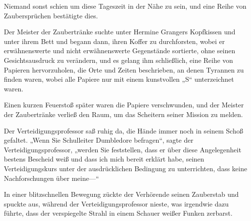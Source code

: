Niemand sonst schien um diese Tageszeit in der Nähe zu sein, und eine Reihe von Zaubersprüchen bestätigte dies.

Der Meister der Zaubertränke suchte unter Hermine Grangers Kopfkissen und unter ihrem Bett und begann dann, ihren Koffer zu durchforsten, wobei er erwähnenswerte und nicht erwähnenswerte Gegenstände sortierte, ohne seinen Gesichtsausdruck zu verändern, und es gelang ihm schließlich, eine Reihe von Papieren hervorzuholen, die Orte und Zeiten beschrieben, an denen Tyrannen zu finden waren, wobei alle Papiere nur mit einem kunstvollen „S“ unterzeichnet waren.

Einen kurzen Feuerstoß später waren die Papiere verschwunden, und der Meister der Zaubertränke verließ den Raum, um das Scheitern seiner Mission zu melden.

\later

Der Verteidigungsprofessor saß ruhig da, die Hände immer noch in seinem Schoß gefaltet. „Wenn Sie Schulleiter Dumbledore befragen“, sagte der Verteidigungsprofessor, „werden Sie feststellen, dass er über diese Angelegenheit bestens Bescheid weiß und dass ich mich bereit erklärt habe, seinen Verteidigungskurs unter der ausdrücklichen Bedingung zu unterrichten, dass keine Nachforschungen über meine—“

In einer blitzschnellen Bewegung zückte der Verhörende seinen Zauberstab und spuckte  aus, während der Verteidigungsprofessor nieste, was irgendwie dazu führte, dass der verspiegelte Strahl in einem Schauer weißer Funken zerbarst.

